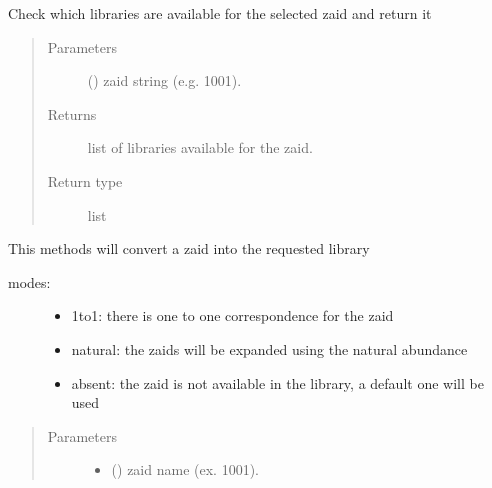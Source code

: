 \documentclass[letterpaper,10pt,english]{sphinxmanual}
\begin{document}
\begin{fulllineitems}
\begin{fulllineitems}
\label{\detokenize{api/initobjects:libmanager.LibManager.check4zaid}}
Check which libraries are available for the selected zaid and return it
\begin{quote}\begin{description}
\item[{Parameters}] \leavevmode
{} () \textendash{} zaid string (e.g. 1001).

\item[{Returns}] \leavevmode
{} \textendash{} list of libraries available for the zaid.

\item[{Return type}] \leavevmode
list

\end{description}\end{quote}

\end{fulllineitems}


\begin{fulllineitems}
\label{\detokenize{api/initobjects:libmanager.LibManager.convertZaid}}
This methods will convert a zaid into the requested library
\begin{description}
\item[{modes:}] \leavevmode\begin{itemize}
\item {} 
1to1: there is one to one correspondence for the zaid

\item {} 
natural: the zaids will be expanded using the natural abundance

\item {} 
absent: the zaid is not available in the library, a default one
will be used

\end{itemize}

\end{description}
\begin{quote}\begin{description}
\item[{Parameters}] \leavevmode\begin{itemize}
\item {} 
 () \textendash{} zaid name (ex. 1001).


\end{itemize}
\end{description}
\end{quote}
\end{fulllineitems}
\end{fulllineitems}
\end{document}
